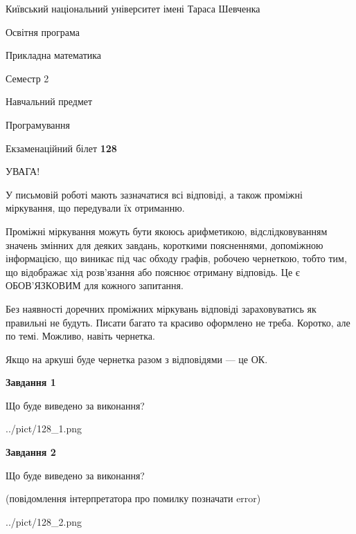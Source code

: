 \documentclass[12pt, ukrainian]{article}
\begin{document}
{{\begin {small}\par
{ \center  Київський національний університет імені Тараса Шевченка \par}
{\parbox {5 cm}{Освітня програма \hfill}{\parbox {7 cm}{Прикладна математика\hfill}}\parbox {6 cm}{\hfill Семестр 2}}\par
{\parbox {5 cm} {Навчальний предмет \hfill}\parbox {7 cm}{Програмування \hfill}\parbox {6cm}{\hfill}\par}\vspace{-7pt} \end{small}}{\center Екзаменаційний білет \No \textbf
{ 128 }\par}}
{
\begin {large}
УВАГА!

У письмовій роботі мають зазначатися всі відповіді, а також проміжні міркування, що передували їх отриманню.

Проміжні міркування можуть бути якоюсь арифметикою, відслідковуванням зна\-чень змінних для деяких завдань,
короткими поясненнями, допоміжною інформацією, що виникає під час обходу графів, робочею чернеткою,
тобто тим, що відображає хід розв’язання або пояснює отриману відповідь.
Це є ОБОВ’ЯЗКОВИМ для кожного запитання.

Без наявності доречних проміжних міркувань відповіді зараховуватись як правиль\-ні не будуть.
Писати багато та красиво оформлено не треба. Коротко, але по темі. Можли\-во, навіть чернетка.

Якщо на аркуші буде чернетка разом з відповідями --- це ОК.

\newpage

{\begin {center}\textbf{Завдання 1}\end {center}}\par
Що буде виведено за виконання?\par
\begin{center}
	{../pict/128_1.png}
\end{center}
\newpage

{\begin {center}\textbf{Завдання 2}\end {center}}\par
Що буде виведено за виконання?\par
 (повідомлення інтерпретатора про помилку позначати error)\par
\begin{center}
	{../pict/128_2.png}
\end{center}
\newpage


\end{large}}
\end{document}
